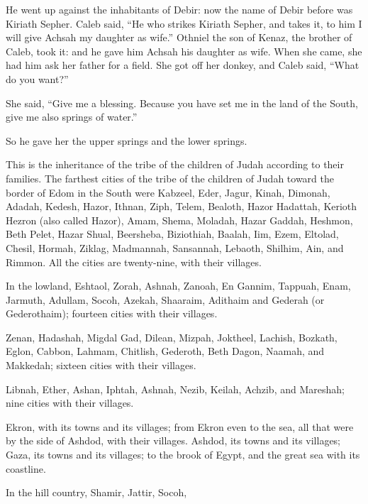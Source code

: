 {He went up against the inhabitants of Debir: now the name of Debir before was Kiriath Sepher.
Caleb said, “He who strikes Kiriath Sepher, and takes it, to him I will give Achsah my daughter as wife.”
Othniel the son of Kenaz, the brother of Caleb, took it: and he gave him Achsah his daughter as wife.
When she came, she had him ask her father for a field. She got off her donkey, and Caleb said, “What do you want?”
\par }{\PP {}She said, “Give me a blessing. Because you have set me in the land of the South, give me also springs of water.”
\par }{\PP So he gave her the upper springs and the lower springs.
\par }{\PP {}This is the inheritance of the tribe of the children of Judah according to their families.
The farthest cities of the tribe of the children of Judah toward the border of Edom in the South were Kabzeel, Eder, Jagur,
Kinah, Dimonah, Adadah,
Kedesh, Hazor, Ithnan,
Ziph, Telem, Bealoth,
Hazor Hadattah, Kerioth Hezron (also called Hazor),
Amam, Shema, Moladah,
Hazar Gaddah, Heshmon, Beth Pelet,
Hazar Shual, Beersheba, Biziothiah,
Baalah, Iim, Ezem,
Eltolad, Chesil, Hormah,
Ziklag, Madmannah, Sansannah,
Lebaoth, Shilhim, Ain, and Rimmon. All the cities are twenty-nine, with their villages.
\par }{\MM {}In the lowland, Eshtaol, Zorah, Ashnah,
Zanoah, En Gannim, Tappuah, Enam,
Jarmuth, Adullam, Socoh, Azekah,
Shaaraim, Adithaim and Gederah (or Gederothaim); fourteen cities with their villages.
\par }{\MM {}Zenan, Hadashah, Migdal Gad,
Dilean, Mizpah, Joktheel,
Lachish, Bozkath, Eglon,
Cabbon, Lahmam, Chitlish,
Gederoth, Beth Dagon, Naamah, and Makkedah; sixteen cities with their villages.
\par }{\MM {}Libnah, Ether, Ashan,
Iphtah, Ashnah, Nezib,
Keilah, Achzib, and Mareshah; nine cities with their villages.
\par }{\MM {}Ekron, with its towns and its villages;
from Ekron even to the sea, all that were by the side of Ashdod, with their villages.
Ashdod, its towns and its villages; Gaza, its towns and its villages; to the brook of Egypt, and the great sea with its coastline.
\par }{\MM {}In the hill country, Shamir, Jattir, Socoh,
}
